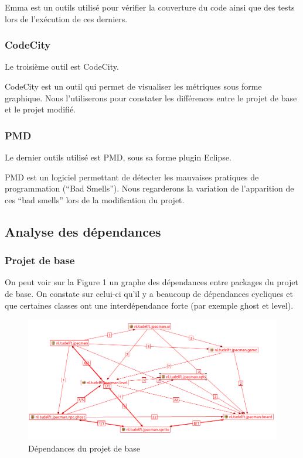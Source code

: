 \documentclass[a4paper,12pt]{report} %
\begin{document}
Emma est un outils utilisé pour vérifier la couverture du code ainsi
que des tests lors de l'exécution de ces derniers.

\subsubsection{CodeCity}
Le troisième outil est CodeCity.

CodeCity est un outil qui permet de visualiser les métriques sous
forme graphique. Nous l'utiliserons pour constater les différences
entre le projet de base et le projet modifié.

\subsubsection{PMD}
Le dernier outils utilisé est PMD, sous sa forme plugin Eclipse.

PMD est un logiciel permettant de détecter les mauvaises pratiques
de programmation (``Bad Smells''). Nous regarderons la variation
de l'apparition de ces ``bad smells'' lors de la modification du
projet.

\subsection{Analyse des dépendances}
\subsubsection{Projet de base}
On peut voir sur la Figure 1 un graphe des dépendances entre packages
du projet de base. On constate sur celui-ci qu'il y a beaucoup de
dépendances cycliques et que certaines classes ont une interdépendance
forte (par exemple ghost et level).

\begin{figure}[!h]
\begin{center}\includegraphics[scale=0.5]{ressources/final_initial_dependencies}\end{center}
\caption{Dépendances du projet de base}
\end{figure}
\end{document}
